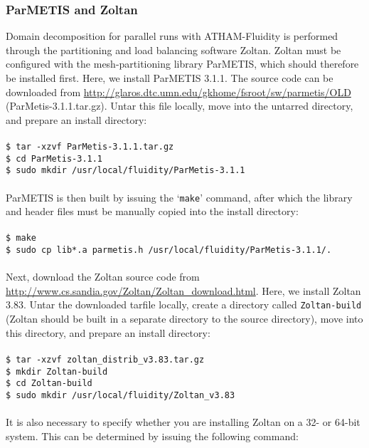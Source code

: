\documentclass[10pt,a4paper]{article}
\newcommand\tab[1][0.5cm]{\hspace*{#1}}
\begin{document}
\subsubsection{ParMETIS and Zoltan}
Domain decomposition for parallel runs with ATHAM-Fluidity is performed through the partitioning and load balancing software Zoltan. Zoltan must be configured with the mesh-partitioning library ParMETIS, which should therefore be installed first. Here, we install ParMETIS 3.1.1. The source code can be downloaded from \url{http://glaros.dtc.umn.edu/gkhome/fsroot/sw/parmetis/OLD} (ParMetis-3.1.1.tar.gz). Untar this file locally, move into the untarred directory, and prepare an install directory:\\\\
\tab \texttt{\$ tar -xzvf ParMetis-3.1.1.tar.gz}\\
\tab \texttt{\$ cd ParMetis-3.1.1}\\
\tab \texttt{\$ sudo mkdir /usr/local/fluidity/ParMetis-3.1.1}\\\\
ParMETIS is then built by issuing the `\texttt{make}' command, after which the library and header files must be manually copied into the install directory:\\\\
\tab \texttt{\$ make}\\
\tab \texttt{\$ sudo cp lib*.a parmetis.h /usr/local/fluidity/ParMetis-3.1.1/.}\\\\
Next, download the Zoltan source code from \url{http://www.cs.sandia.gov/Zoltan/Zoltan\_download.html}. Here, we install Zoltan 3.83. Untar the downloaded tarfile locally, create a directory called \texttt{Zoltan-build} (Zoltan should be built in a separate directory to the source directory), move into this directory, and prepare an install directory:\\\\
\tab \texttt{\$ tar -xzvf zoltan\_distrib\_v3.83.tar.gz}\\
\tab \texttt{\$ mkdir Zoltan-build}\\
\tab \texttt{\$ cd Zoltan-build}\\
\tab \texttt{\$ sudo mkdir /usr/local/fluidity/Zoltan\_v3.83}\\\\
It is also necessary to specify whether you are installing Zoltan on a 32- or 64-bit system. This can be determined by issuing the following command:\\\\
\end{document}
